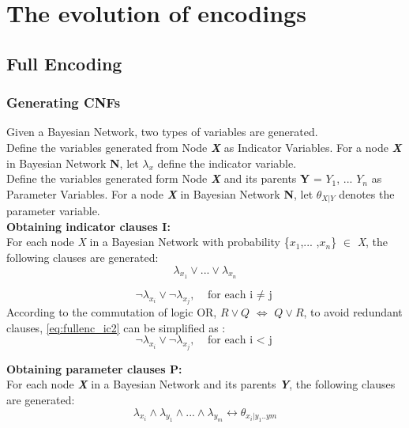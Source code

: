 

\section{The evolution of encodings}
\subsection{Full Encoding}
\subsubsection{Generating CNFs}
Given a Bayesian Network, two types of variables are generated.\\
Define the variables generated from Node \textbf{\textit{X}} as Indicator Variables.
For a node \textbf{\textit{X}} in Bayesian Network \textbf{N}, let $\lambda_x$ define the indicator variable. \\
Define the variables generated form Node \textbf{\textit{X}} and its parents \textbf{Y} = {$Y_{1}$, ... $Y_{n}$} as Parameter Variables.
For a node \textbf{\textit{X}} in Bayesian Network \textbf{N}, let $\theta_{X|Y}$ denotes the parameter variable.\\
\textbf{Obtaining indicator clauses \textsc{I}:}\\
For each node \textit{X} in a Bayesian Network with probability \{$x_{1}$,... ,$x_{n}$\} $\in$ \textit{X}, the following clauses are generated:
\begin{equation}\label{fullenc_ic1}
    \lambda_{x_{1}} \vee ... \vee \lambda_{x_{n}}
\end{equation}

\begin{equation}\label{eq:fullenc_ic2}
    \neg\lambda_{x_{i}} \vee \neg\lambda_{x_{j}}, \;\;\; \mbox{for each i $\neq$ j}
\end{equation}
According to the commutation of logic OR, $R \vee Q$ $\Longleftrightarrow$ $Q \vee R$, to avoid redundant clauses, \ref{eq:fullenc_ic2} can be simplified as :
\begin{equation}\label{fullenc_ic3}
    \neg\lambda_{x_{i}} \vee \neg\lambda_{x_{j}}, \;\;\; \mbox{for each i $<$ j}
\end{equation}

\textbf{Obtaining parameter clauses \textsc{P}:}\\
For each node \textbf{\textit{X}} in a Bayesian Network and its parents \textbf{\textit{Y}}, the following clauses are generated:
\begin{equation}\label{fullenc_pc1}
    \lambda_{x_{i}} \wedge \lambda_{y_{1}} \wedge... \wedge \lambda_{y_{m}} \leftrightarrow \theta_{x_{i}|y_{1}..y{m}}
\end{equation}

